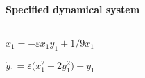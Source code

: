 
\begin{math}
\end{math}
\paragraph{Specified dynamical system}
\begin{math}
\end{math}\par

\begin{math}
\dot x_{1}=-\varepsilon  x_{1} y_{1}+1/9 x_{1}
\end{math}\par

\begin{math}
\dot y_{1}=\varepsilon  \big(x_{1}^{2}-2 y_{1}^{2}\big)-y_{1}
\end{math}\par
